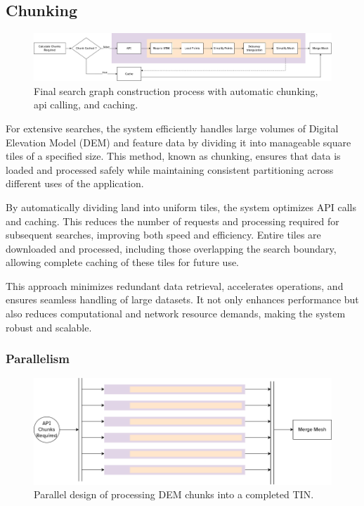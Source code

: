 \documentclass[12pt]{article}
\begin{document}
\subsection{Chunking}

\begin{figure}[!htbp]
  \centering
  \includegraphics[width=1\textwidth]{assets/meshConstruction.png}
  \caption{Final search graph construction process with automatic chunking, api calling, and caching.}\label{fig:meshConstruction:full}
\end{figure}

For extensive searches, the system efficiently handles large volumes of Digital Elevation Model (DEM) and feature data by dividing it into manageable square tiles of a specified size. This method, known as chunking, ensures that data is loaded and processed safely while maintaining consistent partitioning across different uses of the application.

By automatically dividing land into uniform tiles, the system optimizes API calls and caching. This reduces the number of requests and processing required for subsequent searches, improving both speed and efficiency. Entire tiles are downloaded and processed, including those overlapping the search boundary, allowing complete caching of these tiles for future use.

This approach minimizes redundant data retrieval, accelerates operations, and ensures seamless handling of large datasets. It not only enhances performance but also reduces computational and network resource demands, making the system robust and scalable.

\subsubsection{Parallelism}

\begin{figure}[!htbp]
  \centering
  \includegraphics[width=1\textwidth]{assets/meshConstruction-parallel.png}
  \caption{Parallel design of processing DEM chunks into a completed TIN.}
  \label{fig:meshConstruction:thread}
\end{figure}
\end{document}
